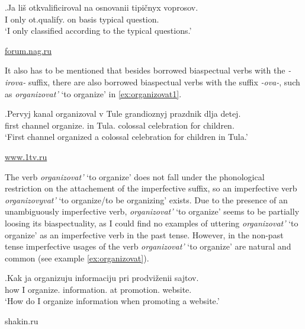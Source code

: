 \exg.\label{ex:otkvalificirovat'}Ja li\v{s} otkvalificiroval na osnovanii tipi\v{c}nyx voprosov.\\
I only ot.qualify. on basis typical question.\\
\trans `I only classified according to the typical questions.'
\begin{flushright}
\vspace{-0.5em}
\url{forum.nag.ru}
\end{flushright}

It also has to be mentioned that besides borrowed biaspectual verbs with the \textit{-irova-} suffix, there are also borrowed biaspectual verbs with the suffix \textit{-ova-}, such as \textit{organizovat'} `to organize' in \ref{ex:organizovat1}. 

\exg.\label{ex:organizovat1}Pervyj kanal organizoval\textsuperscript{\PF} v Tule grandioznyj prazdnik dlja detej.\\
first channel organize. in Tula. colossal celebration for children.\\
\trans `First channel organized a colossal celebration for children in Tula.'
\begin{flushright}
\vspace{-0.5em}
\url{www.1tv.ru}
\end{flushright}

The verb \textit{organizovat'} `to organize' does not fall under the phonological restriction on the attachement of the imperfective suffix, so an imperfective verb \textit{organizovyvat'}\textsuperscript{\IPF} `to organize/to be organizing' exists. Due to the presence of an unambiguously imperfective verb, \textit{organizovat'} `to organize' seems to be partially loosing its biaspectuality, as I could find no examples of uttering \textit{organizovat'} `to organize' as an imperfective verb in the past tense. However, in the non-past tense imperfective usages of the verb \textit{organizovat'} `to organize' are natural and common (see example \ref{ex:organizovat}).

\exg.\label{ex:organizovat}Kak ja organizuju\textsuperscript{\IPF} informaciju pri prodvi\v{z}enii sajtov.\\
how I organize. information. at promotion. website.\\
\trans `How do I organize information when promoting a website.'
\begin{flushright}
\vspace{-0.5em}
shakin.ru
\end{flushright}

